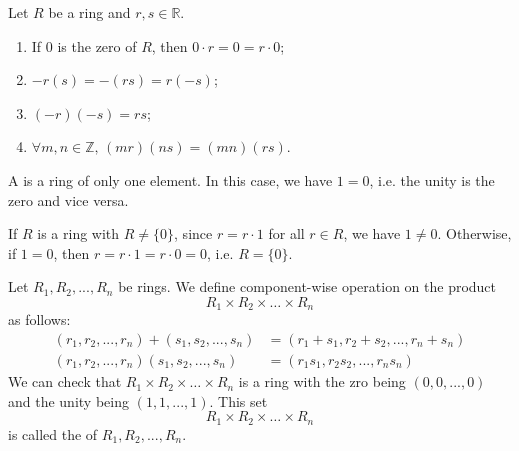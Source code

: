 \begin{propo}
\label{propo:more_properties_of_rings}
  Let $R$ be a ring and $r, s \in \mathbb{R}$.
  \begin{enumerate}
    \item If $0$ is the zero of $R$, then $0 \cdot r = 0 = r \cdot 0$; 
    \item $-r (s) = - (rs) = r (-s)$;
    \item $(-r)(-s) = rs$;
    \item $\forall m, n \in \mathbb{Z}, \, (mr)(ns) = (mn)(rs)$.
  \end{enumerate}
\end{propo}

\begin{defn}
\label{defn:trivial_ring}
A  is a ring of only one element. In this case, we have $1 = 0$, i.e. the unity is the zero and vice versa.
\end{defn}

\begin{remark}
  If $R$ is a ring with $R \neq \{0\}$, since $r = r \cdot 1$ for all $r \in R$, we have $1 \neq 0$. Otherwise, if $1 = 0$, then $r = r \cdot 1 = r \cdot 0 = 0$, i.e. $R = \{0\}$.
\end{remark}

\begin{eg}\label{eg:direct_product_of_rings}
  Let $R_1, R_2, ..., R_n$ be rings. We define component-wise operation on the product
  \begin{equation*}
    R_1 \times R_2 \times \hdots \times R_n
  \end{equation*}
  as follows:
  \begin{align*}
    (r_1, r_2, ..., r_n) + (s_1, s_2, ..., s_n) &= (r_1 + s_1, r_2 + s_2, ..., r_n + s_n) \\
    (r_1, r_2, ..., r_n)(s_1, s_2, ..., s_n) &= (r_1 s_1, r_2 s_2, ..., r_n s_n)
  \end{align*}
  We can check that $R_1 \times R_2 \times \hdots \times R_n$ is a ring with the zro being $(0, 0, ..., 0)$ and the unity being $(1, 1, ..., 1)$. This set
  \begin{equation*}
    R_1 \times R_2 \times \hdots \times R_n
  \end{equation*}
  is called the  of $R_1, R_2, ..., R_n$.
\end{eg}

